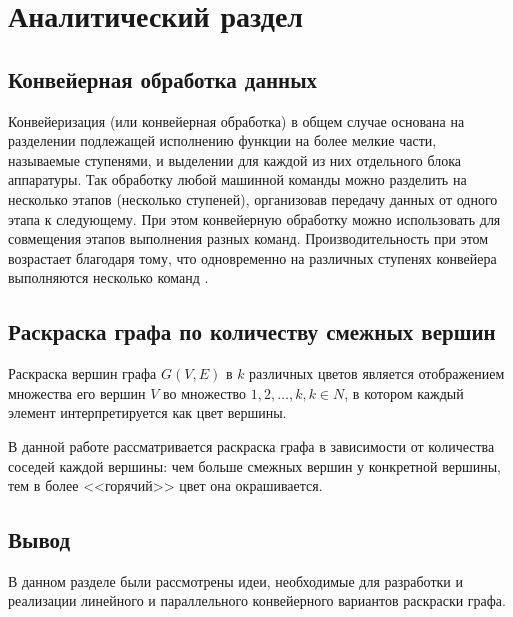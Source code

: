 \section{Аналитический раздел \hfill}
\vspace{\baselineskip}


\subsection{Конвейерная обработка данных}

Конвейеризация (или конвейерная обработка) в общем случае основана на разделении подлежащей исполнению функции на более мелкие части, называемые ступенями, и выделении для каждой из них отдельного блока аппаратуры. Так обработку любой машинной команды можно разделить на несколько этапов (несколько ступеней), организовав передачу данных от одного этапа к следующему. При этом конвейерную обработку можно использовать для совмещения этапов выполнения разных команд. Производительность при этом возрастает благодаря тому, что одновременно на различных ступенях конвейера выполняются несколько команд \cite{conveyor}. 

\subsection{Раскраска графа по количеству смежных вершин}

Раскраска вершин графа $G(V, E)$ в $k$ различных цветов является отображением множества его вершин $V$ во множество ${1,2,\dots,k}, k\in N$, в котором каждый элемент интерпретируется как цвет вершины.

В данной работе рассматривается раскраска графа в зависимости от количества соседей каждой вершины: чем больше смежных вершин у конкретной вершины, тем в более <<горячий>> цвет она окрашивается.

\subsection*{Вывод}

В данном разделе были рассмотрены идеи, необходимые для разработки и реализации линейного и параллельного конвейерного вариантов раскраски графа.
